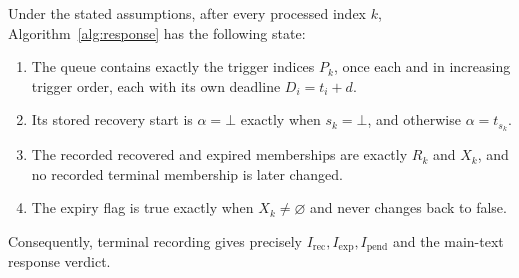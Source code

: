 \begin{proposition}
\label{prop:response-complete}
Under the stated assumptions, after every processed index $k$, Algorithm~\ref{alg:response} has the following state:
\begin{enumerate}
\item The queue contains exactly the trigger indices $P_k$, once each and in increasing trigger order, each with its own deadline $D_i=t_i+d$.
\item Its stored recovery start is $\alpha=\bot$ exactly when $s_k=\bot$, and otherwise $\alpha=t_{s_k}$.
\item The recorded recovered and expired memberships are exactly $R_k$ and $X_k$, and no recorded terminal membership is later changed.
\item The expiry flag is true exactly when $X_k\ne\varnothing$ and never changes back to false.
\end{enumerate}
Consequently, terminal recording gives precisely $I_{\mathrm{rec}},I_{\mathrm{exp}},I_{\mathrm{pend}}$ and the main-text response verdict.
\end{proposition}

